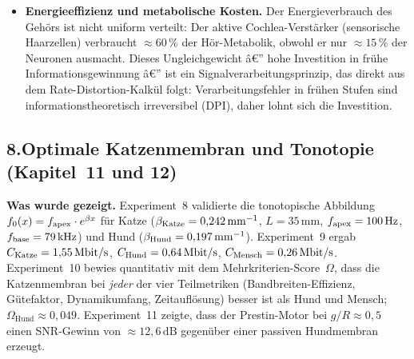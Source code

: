 ﻿\documentclass[12pt,a4paper,titlepage]{report}
\begin{document}
\begin{itemize}[leftmargin=2em]
    Die Informationskapazität eines Burst-Codes übersteigt
    die eines Poisson-Spike-Trains bei gleicher Durchschnittsrate:
    Ein Burst kann binär $2^n$ verschiedene Nachrichten kodieren,
    wobei $n$ die Anzahl möglicher Spikes im Burst ist.
    Ob biologische Burst-Codes in diesem theoretischen Limit operieren,
    ist eine offene empirische Frage.
  \item \textbf{Energieeffizienz und metabolische Kosten.}
    Der Energieverbrauch des Gehörs ist nicht uniform verteilt:
    Der aktive Cochlea-Verstärker (sensorische Haarzellen) verbraucht
    $\approx 60\,\%$ der Hör-Metabolik, obwohl er nur $\approx 15\,\%$
    der Neuronen ausmacht.
    Dieses Ungleichgewicht â€” hohe Investition in frühe Informationsgewinnung â€”
    ist ein Signalverarbeitungsprinzip, das direkt aus dem
    Rate-Distortion-Kalkül folgt: Verarbeitungsfehler in frühen
    Stufen sind informationstheoretisch irreversibel (DPI),
    daher lohnt sich die Investition.
\end{itemize}

\subsection*{8.\enspace Optimale Katzenmembran und Tonotopie
(Kapitel~11 und 12)}

\textbf{Was wurde gezeigt.}
Experiment~8 validierte die tonotopische Abbildung
$f_0(x) = f_{\rm apex}\cdot e^{\beta x}$ für Katze
($\beta_{\rm Katze}=0{,}242\,\mathrm{mm}^{-1}$, $L=35\,\mathrm{mm}$,
$f_{\rm apex}=100\,\mathrm{Hz}$, $f_{\rm base}=79\,\mathrm{kHz}$)
und Hund ($\beta_{\rm Hund}=0{,}197\,\mathrm{mm}^{-1}$).
Experiment~9 ergab $C_{\rm Katze}=1{,}55\,\mathrm{Mbit/s}$,
$C_{\rm Hund}=0{,}64\,\mathrm{Mbit/s}$,
$C_{\rm Mensch}=0{,}26\,\mathrm{Mbit/s}$.
Experiment~10 bewies quantitativ mit dem Mehrkriterien-Score~$\Omega$,
dass die Katzenmembran bei \emph{jeder} der vier Teilmetriken
(Bandbreiten-Effizienz, Gütefaktor, Dynamikumfang, Zeitauflösung)
besser ist als Hund und Mensch; $\Omega_\mathrm{Hund}\approx0{,}049$.
Experiment~11 zeigte, dass der Prestin-Motor bei $g/R\approx0{,}5$
einen SNR-Gewinn von $\approx 12{,}6\,\mathrm{dB}$
gegenüber einer passiven Hundmembran erzeugt.
\end{document}
